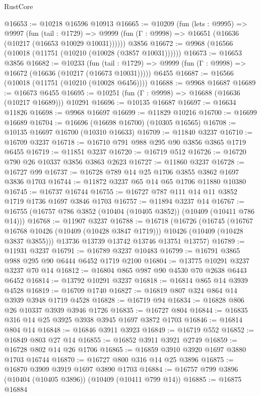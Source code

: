 \begin{lexlean}{RustCore}
\begin{coremodule}
@16653 := @10218 @16596 @10913
@16665 := @10209
    (fun (lets : @9995) =>
    @9997
      (fun (tail : @1729) =>
      @9999 (fun (Γ : @9998) => @16651 (@16636 (@10217 (@16653 @10029 @10031))))))
    @3856
@16672 := @9968 (@16566 (@10018 (@11751 (@10210 (@10028 (@3857 @10031))))))
@16673 := @16653 @3856
@16682 := @10233
    (fun (tail : @1729) => @9999 (fun (Γ : @9998) => @16672 (@16636 (@10217 (@16673 @10031)))))
    @6455
@16687 := @16566 (@10018 (@11751 (@10210 (@10028 @6456))))
@16688 := @9968 @16687
@16689 := @16673 @6455
@16695 := @10251 (fun (Γ : @9998) => @16688 (@16636 (@10217 @16689))) @10291
@16696 := @10135 @16687
@16697 := @16634 @11826
@16698 := @9968 @16697
@16699 := @11829 @10216
@16700 := @16699 @16689
@16704 := @16696 (@16698 @16700) (@10305 @16565)
@16708 := @10135 @16697 @16700 (@10310 @16633)
@16709 := @11840 @3237
@16710 := @16709 @3237
@16718 := @16710 @791 @988 @295 @90 @3856 @3865 @1719 @6455
@16719 := @11851 @3237
@16720 := @16719 @512
@16726 := @16720 @790 @26 @10337 @3856 @3863 @2623
@16727 := @11860 @3237
@16728 := @16727 @99
@16737 := @16728 @789 @14 @25 @1706 @3855 @3862 @1697 @3836 @1703
@16744 := @11872 @3237 @65 @14 @65 @1706 @11880 @10380
@16745 := @16737 @16744
@16755 := @16727 @787 @111 @14 @11 @3852 @1719 @1736 @1697 @3846 @1703
@16757 := @11894 @3237 @14
@16767 := @16755 (@16757 @786 @3852 (@10404 (@10405 @3852)) (@10409 (@10411 @786 @14)))
@16768 := @11907 @3237
@16788 := @16718
    (@16726
      (@16745
        (@16767 @16768 @10426 (@10409 (@10428 @3847 @1719)))
        @10426
        (@10409 (@10428 @3837 @3855)))
      @13736
      @13739
      @13742
      @13746
      @13751
      @13757)
@16789 := @11931 @3237
@16791 := @16789 @3237 @10483
@16799 := @16791 @3865 @988 @295 @90 @6444 @6452 @1719 @2100
@16804 := @13775 @10291 @3237 @3237 @70 @14
@16812 := @16804 @865 @987 @90 @4530 @70 @2638 @6443 @6452
@16814 := @13792 @10291 @3237
@16818 := @16814 @865 @14 @3939 @4528
@16819 := @16709 @1740
@16827 := @16819 @807 @324 @864 @14 @3939 @3948 @1719 @4528
@16828 := @16719 @94
@16834 := @16828 @806 @26 @10337 @3939 @3946 @1726
@16835 := @16727 @804
@16844 := @16835 @316 @14 @25 @3925 @3938 @3945 @1697 @3872 @1703
@16846 := @16814 @804 @14
@16848 := @16846 @3911 @3923
@16849 := @16719 @552
@16852 := @16849 @803 @27 @14
@16855 := @16852 @3911 @3921 @2749
@16859 := @16728 @802 @14 @26 @1706
@16865 := @16859 @3910 @3920 @1697 @3880 @1703 @16744
@16870 := @16727 @800 @316 @14 @25 @3896
@16875 := @16870 @3909 @3919 @1697 @3890 @1703
@16884 := @16757 @799 @3896 (@10404 (@10405 @3896)) (@10409 (@10411 @799 @14))
@16885 := @16875 @16884

\end{coremodule}
\end{lexlean}
